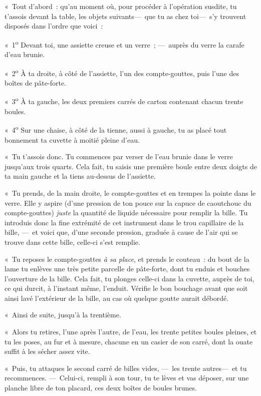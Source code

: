 \documentclass[french,twoside]{book} %
\begin{document}
« Tout d’abord : qu’au moment où, pour procéder à l’opération susdite, tu t’assois devant la table, les objets suivants— que tu as chez toi— s’y trouvent disposés dans l’ordre que voici :\par
« 1\textsuperscript{o} Devant toi, une assiette creuse et un verre ; — auprès du verre la carafe d’eau brunie.\par
« 2\textsuperscript{o} À ta droite, à côté de l’assiette, l’un des compte-gouttes, puis l’une des boîtes de pâte-forte.\par
« 3\textsuperscript{o} À ta gauche, les deux premiers carrés de carton contenant chacun trente boules.\par
« 4\textsuperscript{o} Sur une chaise, à côté de la tienne, aussi à gauche, tu as placé tout bonnement ta cuvette à moitié pleine d’eau.\par
« Tu t’assois donc. Tu commences par verser de l’eau brunie dans le verre jusqu’aux trois quarts. Cela fait, tu saisis une première boule   entre deux doigts de ta main gauche et la tiens au-dessus de l’assiette.\par
« Tu prends, de la main droite, le compte-gouttes et en trempes la pointe dans le verre. Elle y aspire (d’une pression de ton pouce sur la capuce de caoutchouc du compte-gouttes) \emph{juste} la quantité de liquide nécessaire pour remplir la bille. Tu introduis donc la fine extrémité de cet instrument dans le trou capillaire de la bille, — et voici que, d’une seconde pression, graduée à cause de l’air qui se trouve dans cette bille, celle-ci s’est remplie.\par
« Tu reposes le compte-gouttes \emph{à sa place}, et prends le couteau : du bout de la lame tu enlèves une très petite parcelle de pâte-forte, dont tu enduis et bouches l’ouverture de la bille. Cela fait, tu plonges celle-ci dans la cuvette, auprès de toi, ce qui durcit, à l’instant même, l’enduit. Vérifie le bon bouchage avant que soit ainsi lavé l’extérieur de la bille, au cas où quelque goutte aurait débordé.\par
« Ainsi de suite, jusqu’à la trentième.\par
« Alors tu retires, l’une après l’autre, de   l’eau, les trente petites boules pleines, et tu les poses, au fur et à mesure, chacune en un casier de son carré, dont la ouate suffit à les sécher assez vite.\par
« Puis, tu attaques le second carré de billes vides, — les trente autres— et tu recommences. — Celui-ci, rempli à son tour, tu te lèves et vas déposer, sur une planche libre de ton placard, ces deux boîtes de boules brunes.\par
\end{document}
